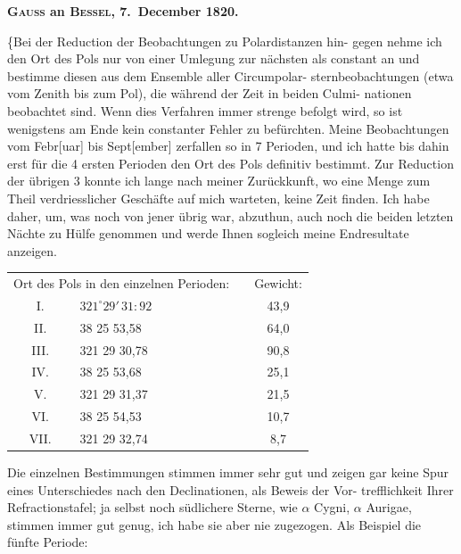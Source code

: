 \documentclass[12pt,a4paper]{article}
\theoremstyle{plain}
\theoremstyle{definition}
\theoremstyle{remark}
\begin{document}
\medskip
\begin{center}
\textbf{\textsc{Gauss} an \textsc{Bessel}, 7.\ December 1820.}
\end{center}

\medskip
\{\dotfill Bei der Reduction der Beobachtungen zu Polardistanzen hin-
gegen nehme ich den Ort des Pols nur von einer Umlegung zur n\"{a}chsten als
constant an und bestimme diesen aus dem Ensemble aller Circumpolar-
sternbeobachtungen (etwa vom Zenith bis zum Pol), die w\"{a}hrend der Zeit in beiden Culmi-
nationen beobachtet sind. Wenn dies Verfahren immer strenge befolgt wird,
so ist wenigstens am Ende kein constanter Fehler zu bef\"{u}rchten. Meine
Beobachtungen vom Febr[uar] bis Sept[ember] zerfallen so in 7 Perioden,
und ich hatte bis dahin erst f\"{u}r die 4 ersten Perioden den Ort des Pols
definitiv bestimmt. Zur Reduction der \"{u}brigen 3 konnte ich lange nach
meiner Zur\"{u}ckkunft, wo eine Menge zum Theil verdriesslicher Gesch\"{a}fte auf
mich warteten, keine Zeit finden. Ich habe daher, um, was noch von jener
\"{u}brig war, abzuthun, auch noch die beiden letzten N\"{a}chte zu H\"{u}lfe genommen
und werde Ihnen sogleich meine Endresultate anzeigen. \dotfill

\begin{center}
\begin{tabular}{c l c | c}
\multicolumn{2}{c}{Ort des Pols in den einzelnen Perioden:} & & Gewicht: \\[0.5em]
I. & $321^\circ 29'\,31\!\!:\!\!92$ & & 43,9 \\
II. & 38 25 53,58 & & 64,0 \\
III. & 321 29 30,78 & & 90,8 \\
IV. & 38 25 53,68 & & 25,1 \\
V. & 321 29 31,37 & & 21,5 \\
VI. & 38 25 54,53 & & 10,7 \\
VII. & 321 29 32,74 & & 8,7 \\
\end{tabular}
\end{center}

Die einzelnen Bestimmungen stimmen immer sehr gut und zeigen gar
keine Spur eines Unterschiedes nach den Declinationen, als Beweis der Vor-
trefflichkeit Ihrer Refractionstafel; ja selbst noch s\"{u}dlichere Sterne, wie $\alpha$
Cygni, $\alpha$ Aurigae, stimmen immer gut genug, ich habe sie aber nie zugezogen.
Als Beispiel die f\"{u}nfte Periode:
\end{document}

